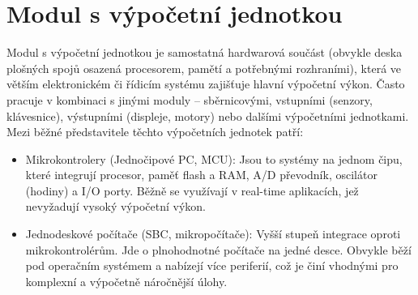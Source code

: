
\section{Modul s výpočetní jednotkou} %

Modul s výpočetní jednotkou je samostatná hardwarová součást (obvykle deska plošných spojů osazená procesorem, pamětí a potřebnými rozhraními), která ve větším elektronickém či řídicím systému zajišťuje hlavní výpočetní výkon. Často pracuje v kombinaci s jinými moduly – sběrnicovými, vstupními (senzory, klávesnice), výstupními (displeje, motory) nebo dalšími výpočetními jednotkami. Mezi běžné představitele těchto výpočetních jednotek patří:
\begin{itemize}
    \item Mikrokontrolery (Jednočipové PC, MCU): Jsou to systémy na jednom čipu, které integrují procesor, paměť flash a RAM, A/D převodník, oscilátor (hodiny) a I/O porty. Běžně se využívají v real-time aplikacích, jež nevyžadují vysoký výpočetní výkon.
    \item Jednodeskové počítače (SBC, mikropočítače): Vyšší stupeň integrace oproti mikrokontrolérům. Jde o plnohodnotné počítače na jedné desce. Obvykle běží pod operačním systémem a nabízejí více periferií, což je činí vhodnými pro komplexní a výpočetně náročnější úlohy.
\end{itemize}



